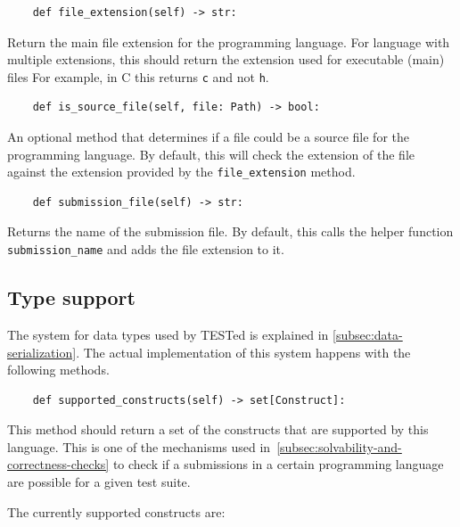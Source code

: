 \documentclass[../main]{subfiles}
\begin{document}
\begin{verbatim}
    def file_extension(self) -> str:
\end{verbatim}

Return the main file extension for the programming language.
For language with multiple extensions, this should return the extension used for executable (main) files
For example, in C this returns \texttt{c} and not \texttt{h}.

\begin{verbatim}
    def is_source_file(self, file: Path) -> bool:
\end{verbatim}

An optional method that determines if a file could be a source file for the programming language.
By default, this will check the extension of the file against the extension provided by the \texttt{file_extension} method.

\begin{verbatim}
    def submission_file(self) -> str:
\end{verbatim}

Returns the name of the submission file.
By default, this calls the helper function \texttt{submission_name} and adds the file extension to it.

\subsection{Type support}\label{subsec:type-support}

The system for data types used by TESTed is explained in \vref{subsec:data-serialization}.
The actual implementation of this system happens with the following methods.

\begin{verbatim}
    def supported_constructs(self) -> set[Construct]:
\end{verbatim}

This method should return a set of the constructs that are supported by this language.
This is one of the mechanisms used in~\vref{subsec:solvability-and-correctness-checks} to check if a submissions in a certain programming language are possible for a given test suite.

The currently supported constructs are:
\end{document}
